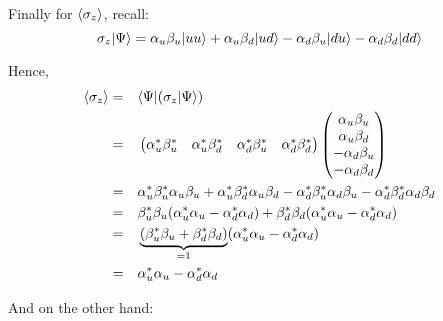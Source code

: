 \documentclass[solutions.tex]{subfiles}
\begin{document}
\hrr
Finally for $\left\langle \sigma_z \right\rangle$, recall:
\[
	\sigma_z|\Psi\rangle = \alpha_u\beta_u|uu\rangle + \alpha_u\beta_d|ud\rangle
		- \alpha_d\beta_u|du\rangle -\alpha_d\beta_d|dd\rangle \\
\]

Hence,
\begin{equation*}\begin{aligned}
	\left\langle \sigma_z \right\rangle &=&& \langle \Psi|(\sigma_z|\Psi\rangle) \\
	~ &=&& \begin{pmatrix}
		\alpha_u^*\beta_u^* & \alpha_u^*\beta_d^* &
		\alpha_d^*\beta_u^* & \alpha_d^*\beta_d^* \\
	\end{pmatrix}\begin{pmatrix}
		\alpha_u\beta_u \\
		\alpha_u\beta_d \\
		-\alpha_d\beta_u\\
		-\alpha_d\beta_d \\
	\end{pmatrix} \\
	~ &=&& \alpha_u^*\beta_u^*\alpha_u\beta_u +
		\alpha_u^*\beta_d^*\alpha_u\beta_d -
		\alpha_d^*\beta_u^*\alpha_d\beta_u -
		\alpha_d^*\beta_d^*\alpha_d\beta_d \\
	~ &=&& \beta_u^*\beta_u(
		\alpha_u^*\alpha_u - \alpha_d^*\alpha_d
	)+\beta_d^*\beta_d(
		\alpha_u^*\alpha_u - \alpha_d^*\alpha_d
	)\\
	~ &=&&
	\underbrace{(\beta_u^*\beta_u + \beta_d^*\beta_d)}_{=1}
	(\alpha_u^*\alpha_u - \alpha_d^*\alpha_d) \\
	~ &=&& \alpha_u^*\alpha_u - \alpha_d^*\alpha_d \\
\end{aligned}\end{equation*}

And on the other hand:
\end{document}
